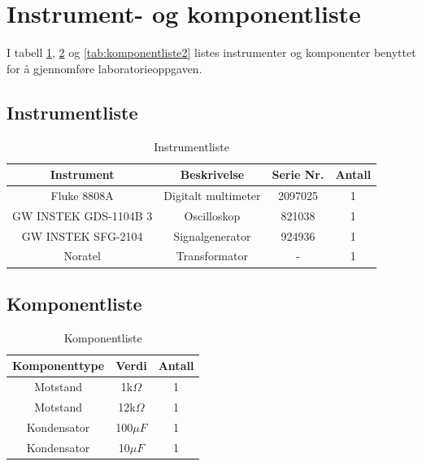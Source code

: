 \section{Instrument- og komponentliste}
    I tabell \ref{tab:instrumentliste}, \ref{tab:komponentliste} og \ref{tab:komponentliste2} listes instrumenter og komponenter benyttet for å gjennomføre laboratorieoppgaven.
    \subsection{Instrumentliste}
    \begin{table}[h]
        \centering
        \caption{Instrumentliste}
        \label{tab:instrumentliste}
        \begin{tabular}{|c|c|c|c|}
            \hline
            \rowcolor[gray]{0.9}
            \textbf{Instrument} & \textbf{Beskrivelse} & \textbf{Serie Nr.} & \textbf{Antall} \\ \hline
            Fluke 8808A & Digitalt multimeter          & 2097025 & 1 \\ \hline
            GW INSTEK GDS-1104B 3 & Oscilloskop          & 821038 & 1 \\ \hline
            GW INSTEK SFG-2104 & Signalgenerator         & 924936 & 1 \\ \hline
            Noratel & Transformator                     & - & 1 \\ \hline
        \end{tabular}
    \end{table}

    \subsection{Komponentliste}
    \begin{table}[h]
        \centering
        \caption{Komponentliste}
        \label{tab:komponentliste}
        \begin{tabular}{|c|c|c|}
            \hline
            \rowcolor[gray]{0.9}
            \textbf{Komponenttype} & \textbf{Verdi} & \textbf{Antall} \\ \hline
            Motstand             & 1k$\Omega$        & 1 \\ \hline
            Motstand             & 12k$\Omega$       & 1 \\ \hline
            Kondensator          & 100$\mu F$           & 1 \\ \hline
            Kondensator          & 10$\mu F$            & 1 \\ \hline
        \end{tabular}
    \end{table}

